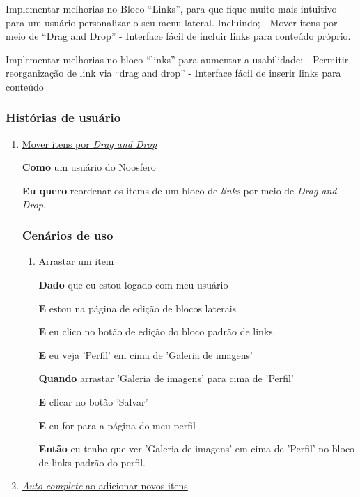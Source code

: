 
Implementar melhorias no Bloco ``Links'', para que fique muito mais intuitivo para um usuário personalizar o seu menu lateral. Incluindo;
- Mover itens por meio de ``Drag and Drop''
- Interface fácil de incluir links para conteúdo próprio.

Implementar melhorias no bloco ``links'' para aumentar a usabilidade:
  - Permitir reorganização de link via ``drag and drop''
  - Interface fácil de inserir links para conteúdo

\subsubsection*{Histórias de usuário}

\begin{enumerate}

\item \underline{Mover itens por \textit{Drag and Drop}}

\textbf{Como} um usuário do Noosfero

\textbf{Eu quero} reordenar os items de um bloco de \textit{links} por meio de
\textit{Drag and Drop}.

\subsubsection*{Cenários de uso}

\begin{enumerate}

\item \underline{Arrastar um item}

\textbf{Dado} que eu estou logado com meu usuário

\textbf{E} estou na página de edição de blocos laterais

\textbf{E} eu clico no botão de edição do bloco padrão de links

\textbf{E} eu veja 'Perfil' em cima de 'Galeria de imagens'

\textbf{Quando} arrastar 'Galeria de imagens' para cima de 'Perfil'

\textbf{E} clicar no botão 'Salvar'

\textbf{E} eu for para a página do meu perfil

\textbf{Então} eu tenho que ver 'Galeria de imagens' em cima de 'Perfil'
no bloco de links padrão do perfil.

\end{enumerate}

\item \underline{\textit{Auto-complete} ao adicionar novos itens}

\end{enumerate}



